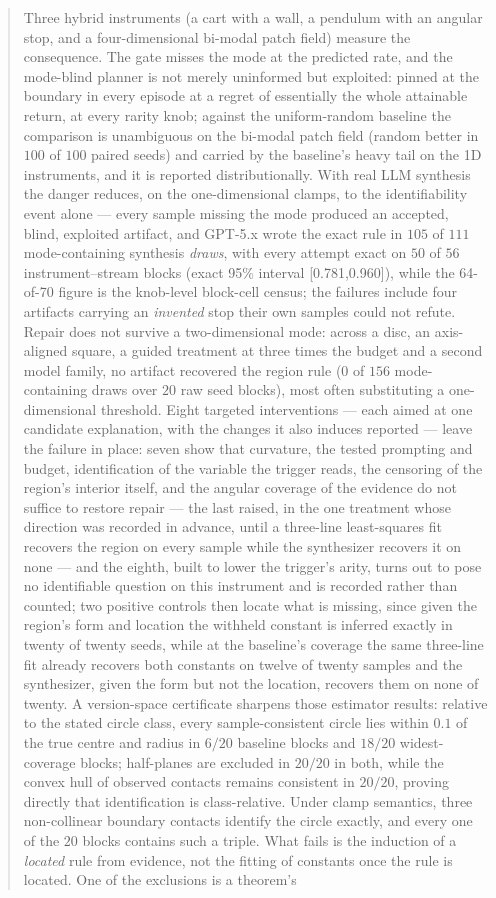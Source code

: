 \documentclass[11pt]{article}
\theoremstyle{definition}
\theoremstyle{remark}
\begin{document}
\begin{abstract}
Three hybrid instruments (a cart with a wall, a pendulum with an angular stop, and a four-dimensional bi-modal patch field) measure the consequence. The gate misses the mode at the predicted rate, and the mode-blind planner is not merely uninformed but exploited: pinned at the boundary in every episode at a regret of essentially the whole attainable return, at every rarity knob; against the uniform-random baseline the comparison is unambiguous on the bi-modal patch field (random better in $100$ of $100$ paired seeds) and carried by the baseline's heavy tail on the 1D instruments, and it is reported distributionally. With real LLM synthesis the danger reduces, on the one-dimensional clamps, to the identifiability event alone --- every sample missing the mode produced an accepted, blind, exploited artifact, and GPT-5.x wrote the exact rule in $105$ of $111$ mode-containing synthesis \emph{draws}, with every attempt exact on $50$ of $56$ instrument--stream blocks (exact 95\% interval [0.781,0.960]), while the 64-of-70 figure is the knob-level block-cell census; the failures include four artifacts carrying an \emph{invented} stop their own samples could not refute. Repair does not survive a two-dimensional mode: across a disc, an axis-aligned square, a guided treatment at three times the budget and a second model family, no artifact recovered the region rule ($0$ of $156$ mode-containing draws over $20$ raw seed blocks), most often substituting a one-dimensional threshold. Eight targeted interventions --- each aimed at one candidate explanation, with the changes it also induces reported --- leave the failure in place: seven show that curvature, the tested prompting and budget, identification of the variable the trigger reads, the censoring of the region's interior itself, and the angular coverage of the evidence do not suffice to restore repair --- the last raised, in the one treatment whose direction was recorded in advance, until a three-line least-squares fit recovers the region on every sample while the synthesizer recovers it on none --- and the eighth, built to lower the trigger's arity, turns out to pose no identifiable question on this instrument and is recorded rather than counted; two positive controls then locate what is missing, since given the region's form and location the withheld constant is inferred exactly in twenty of twenty seeds, while at the baseline's coverage the same three-line fit already recovers both constants on twelve of twenty samples and the synthesizer, given the form but not the location, recovers them on none of twenty. A version-space certificate sharpens those estimator results: relative to the stated circle class, every sample-consistent circle lies within $0.1$ of the true centre and radius in $6/20$ baseline blocks and $18/20$ widest-coverage blocks; half-planes are excluded in $20/20$ in both, while the convex hull of observed contacts remains consistent in $20/20$, proving directly that identification is class-relative. Under clamp semantics, three non-collinear boundary contacts identify the circle exactly, and every one of the $20$ blocks contains such a triple. What fails is the induction of a \emph{located} rule from evidence, not the fitting of constants once the rule is located. One of the exclusions is a theorem's 
\end{abstract}
\end{document}
